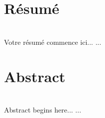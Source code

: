 \documentclass[12pt,a4paper]{article}
\begin{document}
%
% 
%
%
%
% 
% 

\newpage 
\thispagestyle{empty}
\section*{Résumé}~\\[0.2cm]
Votre résumé commence ici...
   ...
\section*{Abstract}~\\[0.2cm]
 Abstract begins here...
   ...
\end{document}
